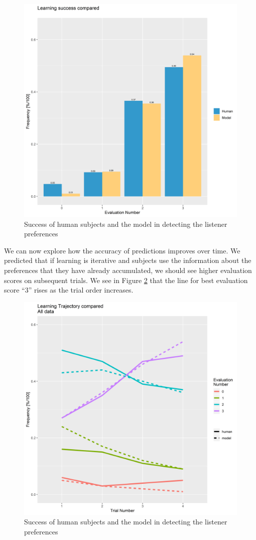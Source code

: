 \documentclass[10pt,a4paper]{article}
\begin{document}
\begin{figure}
	\centering
	\includegraphics[width=.5\linewidth]{images/evalNumCompairPlotWithFirstBlock.png}
	\caption{Success of human subjects and the model in detecting the listener preferences}
	\label{learning-success}
\end{figure}

We can now explore how the accuracy of predictions improves over time. We predicted that if learning is iterative and subjects use the information about the preferences that they have already accumulated, we should see higher evaluation scores on subsequent trials. We see in Figure \ref{learning-progression} that the line for best evaluation score ``3'' rises as the trial order increases.

\begin{figure}
	\centering
	\includegraphics[width=.5\linewidth]{images/LearningProcessLinePlot1.png}
	\caption{Success of human subjects and the model in detecting the listener preferences}
	\label{learning-progression}
\end{figure}
\end{document}
